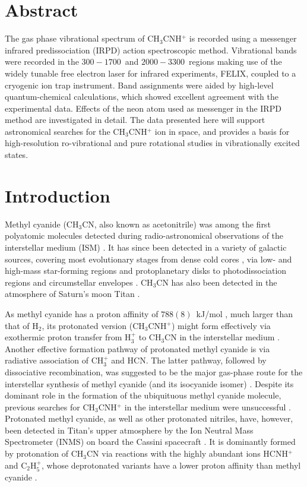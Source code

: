\newcommand{\pa}{CH$_3$CNH$^+$ }
\newcommand{\pan}{CH$_3$CNH$^+$}

\section*{Abstract}
The gas phase vibrational spectrum of \pa is recorded using a messenger infrared predissociation (IRPD) action spectroscopic method. Vibrational bands were recorded in the $300-1700$~\wn and $2000-3300$~\wn regions making use of the widely tunable free electron laser for infrared experiments, FELIX, coupled to a cryogenic ion trap instrument. Band assignments were aided by high-level quantum-chemical calculations, which showed excellent agreement with the experimental data. Effects of the neon atom used as messenger in the IRPD method are investigated in detail. The data presented here will support astronomical searches for the \pa ion in space, and provides a basis for high-resolution ro-vibrational and pure rotational studies in vibrationally excited states.
\clearpage


\section{Introduction}

Methyl cyanide (CH$_3$CN, also known as acetonitrile) was among the first polyatomic molecules detected during radio-astronomical observations of the interstellar medium (ISM) \cite{SJP1971}. It has since been detected in a variety of galactic sources, covering most evolutionary stages from dense cold cores \cite{GMO2016,VLW2019}, via low- and high-mass star-forming regions \cite{AGM2018,FOG2015} and protoplanetary disks \cite{OGF2015} to photodissociation regions \cite{GPG2014} and circumstellar envelopes \cite{ACQ2015}. CH$_3$CN has also been detected in the atmosphere of Saturn's moon Titan \cite{MHB2002,Thelen2019AbundanceObservations,IST2020}.

As methyl cyanide has a proton affinity of $788(8)$~kJ/mol \cite{KFM1986}, much larger than that of H$_2$, its protonated version (\pan) might form effectively via exothermic proton transfer from H$_3^+$ to CH$_3$CN in the interstellar medium \cite{ILB1981}. Another effective formation pathway of protonated methyl cyanide is via radiative association of CH$_3^+$ and HCN. The latter pathway, followed by dissociative recombination, was suggested to be the major gas-phase route for the interstellar synthesis of methyl cyanide (and its isocyanide isomer) \cite{HM1979,DMH1985, VKH2008}. Despite its dominant role in the formation of the ubiquituous methyl cyanide molecule, previous searches for \pa in the interstellar medium were unsuccessful \cite{TAF1990}. Protonated methyl cyanide, as well as other protonated nitriles, have, however, been detected in Titan's upper atmosphere by the Ion Neutral Mass Spectrometer (INMS) on board the Cassini spacecraft \cite{VYA2006}. It is dominantly formed by protonation of CH$_3$CN via reactions with the highly abundant ions HCNH$^+$ and C$_2$H$_5^+$, whose deprotonated variants have a lower proton affinity than methyl cyanide \cite{VYM2007}.

